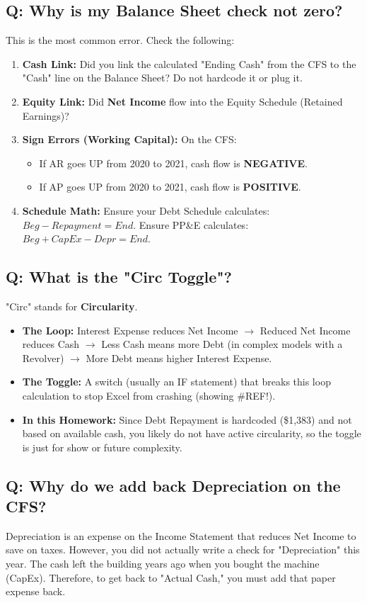 \documentclass[11pt, letterpaper]{article}
\begin{document}
\subsection{Q: Why is my Balance Sheet check not zero?}
This is the most common error. Check the following:
\begin{enumerate}
    \item \textbf{Cash Link:} Did you link the calculated "Ending Cash" from the CFS to the "Cash" line on the Balance Sheet? Do not hardcode it or plug it.
    \item \textbf{Equity Link:} Did \textbf{Net Income} flow into the Equity Schedule (Retained Earnings)?
    \item \textbf{Sign Errors (Working Capital):} On the CFS:
    \begin{itemize}
        \item If AR goes UP from 2020 to 2021, cash flow is \textbf{NEGATIVE}.
        \item If AP goes UP from 2020 to 2021, cash flow is \textbf{POSITIVE}.
    \end{itemize}
    \item \textbf{Schedule Math:} Ensure your Debt Schedule calculates: $Beg - Repayment = End$. Ensure PP\&E calculates: $Beg + CapEx - Depr = End$.
\end{enumerate}

\subsection{Q: What is the "Circ Toggle"?}
"Circ" stands for \textbf{Circularity}.
\begin{itemize}
    \item \textbf{The Loop:} Interest Expense reduces Net Income $\rightarrow$ Reduced Net Income reduces Cash $\rightarrow$ Less Cash means more Debt (in complex models with a Revolver) $\rightarrow$ More Debt means higher Interest Expense.
    \item \textbf{The Toggle:} A switch (usually an IF statement) that breaks this loop calculation to stop Excel from crashing (showing \#REF!).
    \item \textbf{In this Homework:} Since Debt Repayment is hardcoded (\$1,383) and not based on available cash, you likely do not have active circularity, so the toggle is just for show or future complexity.
\end{itemize}

\subsection{Q: Why do we add back Depreciation on the CFS?}
Depreciation is an expense on the Income Statement that reduces Net Income to save on taxes. However, you did not actually write a check for "Depreciation" this year. The cash left the building years ago when you bought the machine (CapEx). Therefore, to get back to "Actual Cash," you must add that paper expense back.
\end{document}
